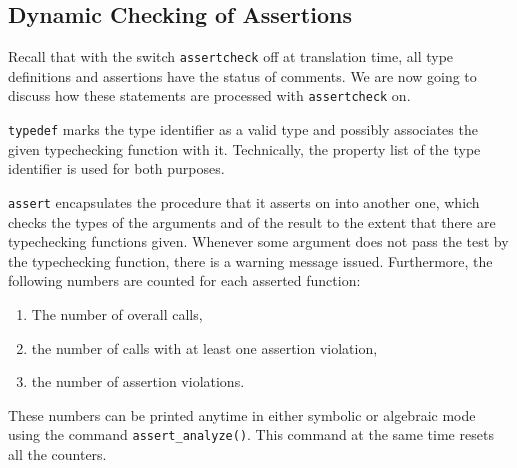 \subsection{Dynamic Checking of Assertions}
Recall that with the switch \texttt{assertcheck} off at translation
time, all type definitions and assertions have the status of comments.
We are now going to discuss how these statements are processed with
\texttt{assertcheck} on.

\texttt{typedef} marks the type identifier as a valid type and possibly
associates the given typechecking function with it. Technically, the
property list of the type identifier is used for both purposes.

\texttt{assert} encapsulates the procedure that it asserts on into
another one, which checks the types of the arguments and of the result
to the extent that there are typechecking functions given. Whenever some
argument does not pass the test by the typechecking function, there is a
warning message issued. Furthermore, the following numbers are counted
for each asserted function:
\begin{enumerate}
\item The number of overall calls,
\item the number of calls with at least one assertion violation,
\item the number of assertion violations.
\end{enumerate}
These numbers can be printed anytime in either symbolic or algebraic
mode using the command \texttt{assert\_analyze()}. This command at the
same time resets all the counters.

